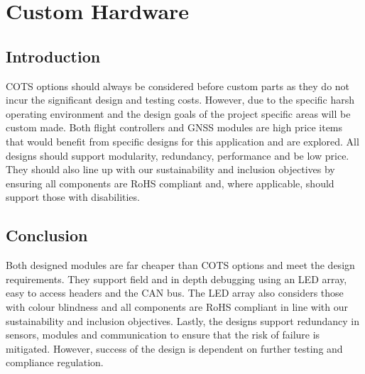 \newpage
{}
\section{Custom Hardware} \label{section:Custom Hardware}
\subsection{Introduction}\label{sub_section:tgt_custom_hardware_intro}
\gls{COTS} options should always be considered before custom parts as they do not incur the significant design and testing costs. However, due to the specific harsh operating environment and the design goals of the project specific areas will be custom made. Both flight controllers and \gls{GNSS} modules are high price items that would benefit from specific designs for this application and are explored. All designs should support modularity, redundancy, performance and be low price. They should also line up with our sustainability and inclusion objectives by ensuring all components are \gls{RoHS} compliant and, where applicable, should support those with disabilities.





\subsection{Conclusion}
Both designed modules are far cheaper than \gls{COTS} options and meet the design requirements. They support field and in depth debugging using an \gls{LED} array, easy to access headers and the \gls{CAN} bus. The LED array also considers those with colour blindness and all components are \gls{RoHS} compliant in line with our sustainability and inclusion objectives. Lastly, the designs support redundancy in sensors, modules and communication to ensure that the risk of failure is mitigated. However, success of the design is dependent on further testing and compliance regulation.